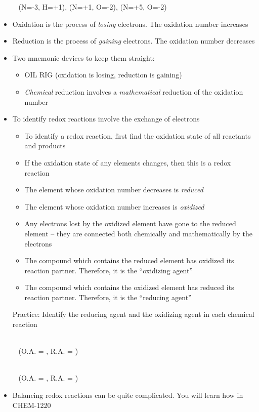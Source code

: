 \documentclass[12pt, openany, letterpaper]{memoir}
\begin{document}
\begin{itemize}
	~\hphantom{Practice:} (N=-3, H=+1), (N=+1, O=-2), (N=+5, O=-2)
	\item Oxidation is the process of \emph{losing} electrons. The oxidation number increases
	\item Reduction is the process of \emph{gaining} electrons. The oxidation number decreases
	\item Two mnemonic devices to keep them straight:
	\begin{itemize} 
		\item OIL RIG (oxidation is losing, reduction is gaining)
		\item \emph{Chemical} reduction involves a \emph{mathematical} reduction of the oxidation number
	\end{itemize}
	\item To identify redox reactions involve the exchange of electrons
	\begin{itemize}
		\item To identify a redox reaction, first find the oxidation state of all reactants and products
		\item If the oxidation state of any elements changes, then this is a redox reaction
		\item The element whose oxidation number decreases is \emph{reduced}
		\item The element whose oxidation number increases is \emph{oxidized}
		\item Any electrons lost by the oxidized element have gone to the reduced element -- they are connected both chemically and mathematically by the electrons
		\item The compound which contains the reduced element has oxidized its reaction partner. Therefore, it is the ``oxidizing agent''
		\item The compound which contains the oxidized element has reduced its reaction partner. Therefore, it is the ``reducing agent''
	\end{itemize}

	Practice: Identify the reducing agent and the oxidizing agent in each chemical reaction
	
	~\hphantom{Practice:} \\
	~\hphantom{Practice: } (O.A. = , R.A. = )
	
	~\hphantom{Practice:} \\
	~\hphantom{Practice: } (O.A. = , R.A. = )	
	\item Balancing redox reactions can be quite complicated. You will learn how in CHEM-1220
\end{itemize}
\end{document}

